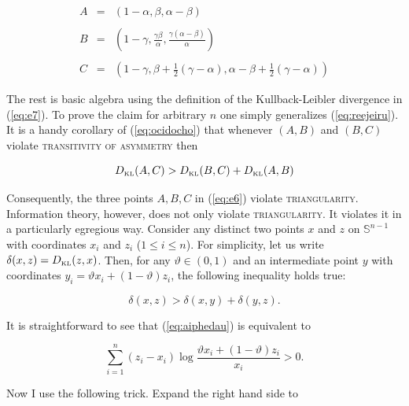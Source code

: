 \documentclass[smallextended]{svjour3}       %
\begin{document}
\begin{equation}
  \label{eq:reejeiru}
  \begin{array}{rcl}
    A&=&\left(1-\alpha,\beta,\alpha-\beta\right) \\
     && \\
    B&=&\left(1-\gamma,\frac{\gamma\beta}{\alpha},\frac{\gamma(\alpha-\beta)}{\alpha}\right) \\
     && \\
    C&=&\left(1-\gamma,\beta+\frac{1}{2}(\gamma-\alpha),\alpha-\beta+\frac{1}{2}(\gamma-\alpha)\right)
  \end{array}
\end{equation}

The rest is basic algebra using the definition of the Kullback-Leibler
divergence in (\ref{eq:e7}). To prove the claim for arbitrary $n$
one simply generalizes (\ref{eq:reejeiru}). It is a handy corollary of
(\ref{eq:ocidocho}) that whenever $(A,B)$ and $(B,C)$ violate
\textsc{transitivity of asymmetry} then 

\begin{equation}
  \label{eq:saithain}
  D_{\mbox{\tiny KL}}(A,C)>D_{\mbox{\tiny KL}}(B,C)+D_{\mbox{\tiny KL}}(A,B)
\end{equation}

Consequently, the three points $A,B,C$ in (\ref{eq:e6}) violate
\textsc{triangularity}. Information theory, however, does not only
violate \textsc{triangularity}. It violates it in a particularly
egregious way. Consider any distinct two points $x$ and $z$ on
$\mathbb{S}^{n-1}$ with coordinates $x_{i}$ and $z_{i}$
($1\leq{}i\leq{}n$). For simplicity, let us write
$\delta(x,z)=D_{\mbox{\tiny KL}}(z,x)$. Then, for any
$\vartheta\in{}(0,1)$ and an intermediate point $y$ with coordinates
$y_{i}=\vartheta{}x_{i}+(1-\vartheta)z_{i}$, the following inequality
holds true:

\begin{equation}
  \label{eq:aiphedau}
  \delta(x,z)>\delta\left(x,y\right)+\delta\left(y,z\right).
\end{equation}

It is straightforward to see that (\ref{eq:aiphedau}) is equivalent to

\begin{equation}
  \label{eq:eiquotoh}
  \sum_{i=1}^{n}(z_{i}-x_{i})\log\frac{\vartheta{}x_{i}+(1-\vartheta)z_{i}}{x_{i}}>0.
\end{equation}

Now I use the following trick. Expand the right hand side to
\end{document}

